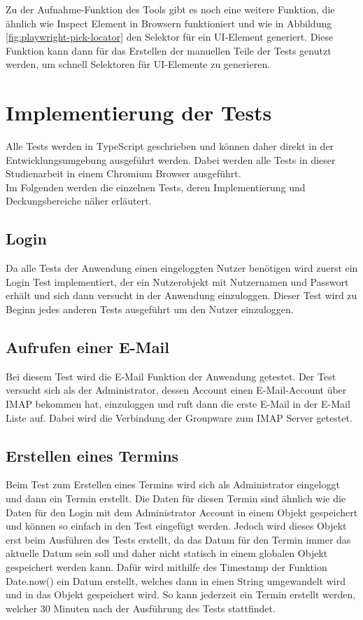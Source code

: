 Zu der Aufnahme-Funktion des Tools gibt es noch eine weitere Funktion, die ähnlich wie Inspect Element in Browsern funktioniert und wie in Abbildung \ref{fig:playwright-pick-locator} den Selektor für ein UI-Element generiert.
Diese Funktion kann dann für das Erstellen der manuellen Teile der Tests genutzt werden, um schnell Selektoren für UI-Elemente zu generieren.



\section{Implementierung der Tests}

Alle Tests werden in TypeScript geschrieben und können daher direkt in der Entwicklungsumgebung ausgeführt werden.
Dabei werden alle Tests in dieser Studienarbeit in einem Chromium Browser ausgeführt.
\\
Im Folgenden werden die einzelnen Tests, deren Implementierung und Deckungsbereiche näher erläutert.

\subsection{Login}

Da alle Tests der Anwendung einen eingeloggten Nutzer benötigen wird zuerst ein Login Test implementiert, der ein Nutzerobjekt mit Nutzernamen und Passwort erhält und sich dann versucht in der Anwendung einzuloggen.
Dieser Test wird zu Beginn jedes anderen Tests ausgeführt um den Nutzer einzuloggen.

\subsection{Aufrufen einer E-Mail}

Bei diesem Test wird die E-Mail Funktion der Anwendung getestet.
Der Test versucht sich als der Administrator, dessen Account einen E-Mail-Account über IMAP bekommen hat, einzuloggen und ruft dann die erste E-Mail in der E-Mail Liste auf.
Dabei wird die Verbindung der Groupware zum IMAP Server getestet.

\subsection{Erstellen eines Termins}

Beim Test zum Erstellen eines Termins wird sich als Administrator eingeloggt und dann ein Termin erstellt.
Die Daten für diesen Termin sind ähnlich wie die Daten für den Login mit dem Administrator Account in einem Objekt gespeichert und können so einfach in den Test eingefügt werden.
Jedoch wird dieses Objekt erst beim Ausführen des Tests erstellt, da das Datum für den Termin immer das aktuelle Datum sein soll und daher nicht statisch in einem globalen Objekt gespeichert werden kann.
Dafür wird mithilfe des Timestamp der Funktion Date.now() ein Datum erstellt, welches dann in einen String umgewandelt wird und in das Objekt gespeichert wird.
So kann jederzeit ein Termin erstellt werden, welcher 30 Minuten nach der Ausführung des Tests stattfindet.

